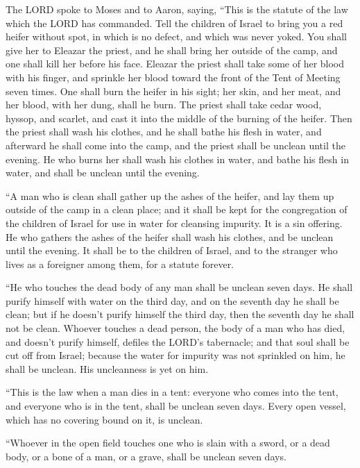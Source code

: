 \mychapter{} \myverse*{}The LORD spoke to Moses and to Aaron, saying,
\myverse{}“This is the statute of the law which the LORD has commanded. Tell the children
of Israel to bring you a red heifer without spot, in which is no defect, and which was never yoked.
\myverse{}You shall give her to Eleazar the priest, and he shall bring her outside of
the camp, and one shall kill her before his face.
\myverse{}Eleazar the priest shall take some of her blood with his finger, and sprinkle
her blood toward the front of the Tent of Meeting seven times.
\myverse{}One shall burn the heifer in his sight; her skin, and her meat, and her blood,
with her dung, shall he burn.
\myverse{}The priest shall take cedar wood, hyssop, and scarlet, and cast it into the
middle of the burning of the heifer.
\myverse{}Then the priest shall wash his clothes, and he shall bathe his flesh in water,
and afterward he shall come into the camp, and the priest shall be unclean until the evening.
\myverse{}He who burns her shall wash his clothes in water, and bathe his flesh in water,
and shall be unclean until the evening.


\myverse{}“A man who is clean shall gather up the ashes of the heifer, and
lay them up outside of the camp in a clean place; and it shall be kept for the congregation of the children
of Israel for use in water for cleansing impurity. It is a sin offering.
\myverse{}He who gathers the ashes of the heifer shall wash his clothes, and be unclean
until the evening. It shall be to the children of Israel, and to the stranger who lives as a foreigner
among them, for a statute forever.


\myverse{}“He who touches the dead body of any man shall be unclean seven
days.
\myverse{}He shall purify himself with water on the third day, and on the seventh day
he shall be clean; but if he doesn’t purify himself the third day, then the seventh day he shall not be
clean.
\myverse{}Whoever touches a dead person, the body of a man who has died, and doesn’t
purify himself, defiles the LORD’s tabernacle; and that soul shall be cut off from Israel; because the
water for impurity was not sprinkled on him, he shall be unclean. His uncleanness is yet on him.


\myverse{}“This is the law when a man dies in a tent: everyone who comes
into the tent, and everyone who is in the tent, shall be unclean seven days.
\myverse{}Every open vessel, which has no covering bound on it, is unclean.


\myverse{}“Whoever in the open field touches one who is slain with a sword,
or a dead body, or a bone of a man, or a grave, shall be unclean seven days.


